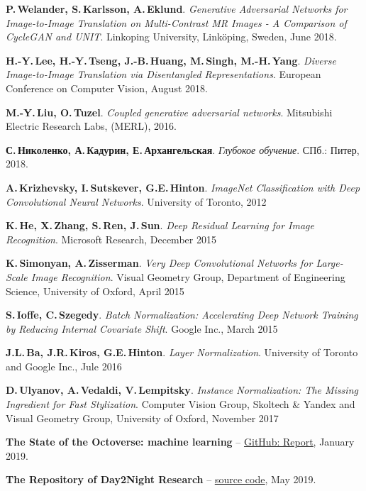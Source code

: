 \documentclass[11pt,a4paper]{extarticle}
\begin{document}
{\begin{thebibliography}{00}
	\textbf{P.\,Welander, S.\,Karlsson, A.\,Eklund}.
	\emph{Generative Adversarial Networks for Image-to-Image Translation on Multi-Contrast MR Images - A Comparison of CycleGAN and UNIT}.
	Linkoping University, Linköping, Sweden,
	June 2018.

	\textbf{H.-Y.\,Lee, H.-Y.\,Tseng, J.-B.\,Huang, M.\,Singh, M.-H.\,Yang}.
	\emph{Diverse Image-to-Image Translation via Disentangled Representations}.
	European Conference on Computer Vision,
	August 2018.

	\textbf{M.-Y.\,Liu, O.\,Tuzel}.
	\emph{Coupled generative adversarial networks}.
	Mitsubishi Electric Research Labs, (MERL),
	2016.

	\textbf{С.\,Николенко, А.\,Кадурин, Е.\,Архангельская}.
	\emph{Глубокое обучение}.
	СПб.: Питер, 
	2018.

	\textbf{A.\,Krizhevsky, I.\,Sutskever, G.E.\,Hinton}.
	\emph{ImageNet Classification with Deep Convolutional Neural Networks}.
	University of Toronto,
	2012

	\textbf{K.\,He, X.\,Zhang, S.\,Ren, J.\,Sun}.
	\emph{Deep Residual Learning for Image Recognition}.
	Microsoft Research,
	December 2015

	\textbf{K.\,Simonyan, A.\,Zisserman}.
	\emph{Very Deep Convolutional Networks for Large-Scale Image Recognition}.
	Visual Geometry Group, Department of Engineering Science, University of Oxford,
	April 2015

	\textbf{S.\,Ioffe, C.\,Szegedy}.
	\emph{Batch Normalization: Accelerating Deep Network Training by Reducing Internal Covariate Shift}.
	Google Inc.,
	March 2015

	\textbf{J.L.\,Ba, J.R.\,Kiros, G.E.\,Hinton}.
	\emph{Layer Normalization}.
	University of Toronto and Google Inc.,
	Jule 2016

	\textbf{D.\,Ulyanov, A.\,Vedaldi, V.\,Lempitsky}.
	\emph{Instance Normalization: The Missing Ingredient for Fast Stylization}.
	Computer Vision Group, Skoltech \& Yandex and Visual Geometry Group, University of Oxford,
	November 2017

	\textbf{The State of the Octoverse: machine learning} --
	\href{https://github.blog/2019-01-24-the-state-of-the-octoverse-machine-learning/}{\underline{GitHub: Report}},
	January 2019.

	\textbf{The Repository of Day2Night Research} --
	\href{https://github.com/solesensei/day2night}{\underline{source code}},
	May 2019.


\end{thebibliography}}
\end{document}
